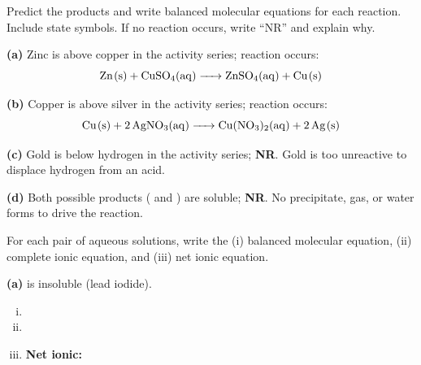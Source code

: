 \documentclass[addpoints]{exam}
\begin{document}
\begin{questions}
\question Predict the products and write balanced molecular equations for each reaction.
Include state symbols. If no reaction occurs, write ``NR'' and explain why.
\begin{solution}[9cm]
\textbf{(a)} Zinc is above copper in the activity series; reaction occurs:
\[\ce{Zn(s) + CuSO4(aq) -> ZnSO4(aq) + Cu(s)}\]

\textbf{(b)} Copper is above silver in the activity series; reaction occurs:
\[\ce{Cu(s) + 2AgNO3(aq) -> Cu(NO3)2(aq) + 2Ag(s)}\]

\textbf{(c)} Gold is below hydrogen in the activity series; \textbf{NR}. Gold is too
unreactive to displace hydrogen from an acid.

\textbf{(d)} Both possible products ( and ) are soluble; \textbf{NR}.
No precipitate, gas, or water forms to drive the reaction.
\end{solution}

\question For each pair of aqueous solutions, write the (i) balanced molecular equation,
(ii) complete ionic equation, and (iii) net ionic equation.
\begin{solution}[10cm]
\textbf{(a)}  is insoluble (lead iodide).
\begin{enumerate}[(i)]
\item {}
\item {}
\item \textbf{Net ionic:} 
\end{enumerate}


\end{solution}
\end{questions}
\end{document}
